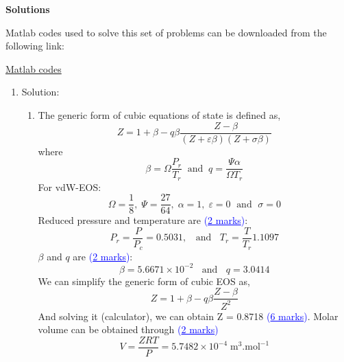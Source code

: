 \documentclass[12pts,a4paper,amsmath,amssymb,floatfix]{article}%
\renewcommand\epsilon{\varepsilon}
\newcommand{\frc}{\displaystyle\frac}
\newcommand{\blue}{\textcolor{blue}}
\begin{document}
\clearpage

\begin{center}
  \Large{\bf Solutions}
\end{center}

Matlab codes used to solve this set of problems can be downloaded from the following link:
\begin{center}
    \href{https://www.dropbox.com/s/trda0r0ubqeuh88/Practical.zip?dl=0}{Matlab codes}
\end{center}

\begin{enumerate}[label=\bfseries Problem \arabic*:]
   \item Solution:
      \begin{enumerate}[label=\bfseries Task \arabic*:]
          \item The generic form of cubic equations of state is defined as,
              \begin{displaymath}
                 Z = 1 + \beta - q\beta \frc{Z - \beta}{\left(Z+\epsilon\beta\right)\left(Z+\sigma\beta\right)}
              \end{displaymath}
              where 
              \begin{displaymath}
                 \beta = \Omega\frc{P_{r}}{T_{r}}\;\;\text{and}\;\; q = \frc{\Psi\alpha}{\Omega T_{r}}
              \end{displaymath}
              For vdW-EOS:
              \begin{displaymath}
                  \Omega = \frc{1}{8},\; \Psi=\frc{27}{64},\; \alpha=1,\; \epsilon = 0\;\text{ and }\; \sigma=0
              \end{displaymath}
              Reduced pressure and temperature are \blue{(\underline{2 marks})}:
              \begin{displaymath}
                  P_{r} = \frc{P}{P_{c}} = 0.5031,\;\;\text{ and }\;\; T_{r} = \frc{T}{T_{r}} 1.1097
              \end{displaymath}
              $\beta$ and $q$ are \blue{(\underline{2 marks})}:
              \begin{displaymath}
                 \beta = 5.6671\times 10^{-2}\;\;\text{ and }\;\; q = 3.0414
              \end{displaymath}
              We can simplify the generic form of cubic EOS as,
              \begin{displaymath}
                  Z =  1 + \beta - q\beta\frc{Z-\beta}{Z^{2}}
              \end{displaymath}
              And solving it (calculator), we can obtain Z = 0.8718 \blue{(\underline{6 marks})}. Molar volume can be obtained through \blue{(\underline{2 marks})}
              \begin{displaymath}
                  V = \frc{Z R T}{P} = 5.7482\times 10^{-4}\;\text{m}^{3}.\text{mol}^{-1}
              \end{displaymath}


\end{enumerate}
\end{enumerate}
\end{document}
